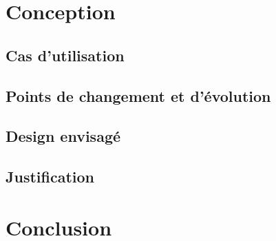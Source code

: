 \documentclass{report}
\begin{document}
\chapter{Conception}
			
	\section{Cas d'utilisation}
			 \label{cas_utilisation}

	\newpage			
	\section{Points de changement et d'évolution}
			 \label{changement}
			 \label{evolution}
			
	\section{Design envisagé}
			 \label{design}
			
	\newpage
	\section{Justification}
			 \label{justification}
			

\chapter{Conclusion}
	 \label{conclusion}
\end{document}
